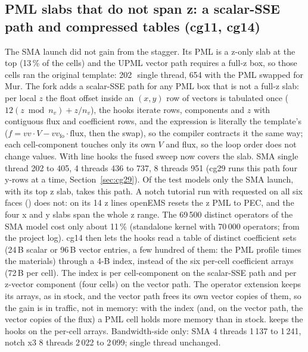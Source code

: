 \subsection{PML slabs that do not span z: a scalar-SSE path and compressed tables (cg11, cg14)}
The SMA launch did not gain from the stagger. Its PML is a z-only slab at the top (13\,\% of the cells) and the UPML
vector path requires a full-z box, so those cells ran the original template: 202\,\MC\ single thread, 654 with the PML
swapped for Mur. The fork adds a scalar-SSE path for any PML box that is not a full-z slab: per local $z$ the float
offset inside an $(x,y)$ row of vectors is tabulated once ($12(z \bmod n_v) + z/n_v$), the hooks iterate rows,
components and $z$ with contiguous flux and coefficient rows, and the expression is literally the template's
($f = vv\cdot V - vv_{\text{fo}}\cdot\text{flux}$, then the swap), so the compiler contracts it the same way; each
cell-component touches only its own $V$ and flux, so the loop order does not change values. With line hooks the fused
sweep now covers the slab. SMA single thread 202 to 405, 4 threads 436 to 737, 8 threads 951 (cg29 runs this path four
y-rows at a time, Section~\ref{sec:cg29}). Of the test models only
the SMA launch, with its top z slab, takes this path. A notch tutorial run with  requested on all six
faces () does not: on its 14 z lines openEMS resets the z PML to PEC, and the
four x and y slabs span the whole z range. The 69\,500 distinct
operators of the SMA model cost only about 11\,\% (standalone kernel with 70\,000 operators; from the project log).
cg14 then lets the hooks read a table of distinct coefficient sets (24\,B scalar or 96\,B vector entries, a few
hundred of them: the PML profile times the materials) through a 4-B index, instead of the six per-cell coefficient
arrays (72\,B per cell). The index is per cell-component on the scalar-SSE path and per z-vector component (four
cells) on the vector path. The operator extension keeps its arrays, as in stock, and the vector path frees its own
vector copies of them, so the gain is in traffic, not in memory: with the index (and, on the vector path, the vector
copies of the flux) a PML cell holds more memory than in stock.  keeps the hooks on
the per-cell arrays. Bandwidth-side only: SMA 4 threads 1\,137 to 1\,241, notch x3 8 threads 2\,022 to 2\,099; single
thread unchanged.

